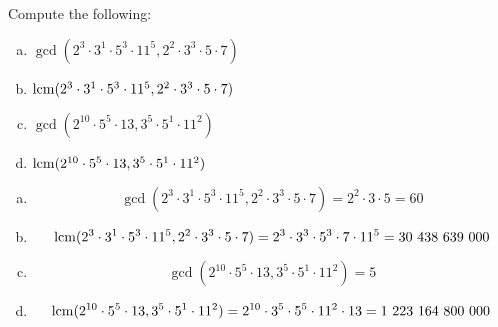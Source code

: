 \documentclass[11pt,letterpaper]{article}
\begin{document}
\newpage



 Compute the following:
	\begin{enumerate}[(a)]
	\item $\gcd(2^3 \cdot 3^1 \cdot 5^3 \cdot 11^5, 2^2 \cdot 3^3 \cdot 5 \cdot 7)$
	\item $\operatorname{lcm}(2^3 \cdot 3^1 \cdot 5^3 \cdot 11^5, 2^2 \cdot 3^3 \cdot 5 \cdot 7)$
	\item $\gcd(2^{10} \cdot 5^5 \cdot 13, 3^5 \cdot 5^1 \cdot 11^2)$
	\item $\operatorname{lcm}(2^{10} \cdot 5^5 \cdot 13, 3^5 \cdot 5^1 \cdot 11^2)$
	\end{enumerate} \pspace

\sol
\begin{enumerate}[(a)]
\item 
	\[
	\gcd(2^3 \cdot 3^1 \cdot 5^3 \cdot 11^5, 2^2 \cdot 3^3 \cdot 5 \cdot 7)= 2^2 \cdot 3 \cdot 5= 60
	\] \pspace

\item 
	\[
	\operatorname{lcm}(2^3 \cdot 3^1 \cdot 5^3 \cdot 11^5, 2^2 \cdot 3^3 \cdot 5 \cdot 7)= 2^3 \cdot 3^3 \cdot 5^3 \cdot 7 \cdot 11^5= 30\ 438\ 639\ 000
	\] \pspace

\item 
	\[
	\gcd(2^{10} \cdot 5^5 \cdot 13, 3^5 \cdot 5^1 \cdot 11^2)= 5
	\] \pspace

\item 
	\[
	\operatorname{lcm}(2^{10} \cdot 5^5 \cdot 13, 3^5 \cdot 5^1 \cdot 11^2)= 2^{10} \cdot 3^5 \cdot 5^5 \cdot 11^2 \cdot 13= 1\ 223\ 164\ 800\ 000
	\]
\end{enumerate}
\end{document}
